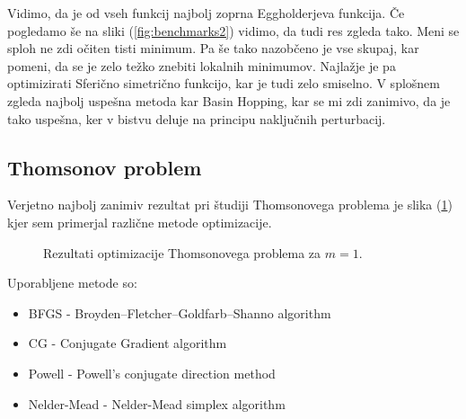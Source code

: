 \documentclass[a4paper]{article}
\begin{document}
Vidimo, da je od vseh funkcij najbolj zoprna Eggholderjeva funkcija. Če pogledamo še na sliki (\ref{fig:benchmarks2})
vidimo, da tudi res zgleda tako. Meni se sploh ne zdi očiten tisti minimum. Pa še tako nazobčeno je vse skupaj, kar 
pomeni, da se je zelo težko znebiti lokalnih minimumov. Najlažje je pa optimizirati Sferično simetrično funkcijo,
kar je tudi zelo smiselno. V splošnem zgleda najbolj uspešna metoda kar Basin Hopping, kar se mi zdi zanimivo, da
je tako uspešna, ker v bistvu deluje na principu naključnih perturbacij. \\

\subsection{Thomsonov problem}
Verjetno najbolj zanimiv rezultat pri študiji Thomsonovega problema je slika (\ref{fig:thomson_benchmark}) kjer sem 
primerjal različne metode optimizacije. 

\begin{figure}[H]
    \centering
    \caption{Rezultati optimizacije Thomsonovega problema za $m=1$.}
    \label{fig:thomson_benchmark}
\end{figure}

Uporabljene metode so:

\begin{itemize}
    \item BFGS - Broyden–Fletcher–Goldfarb–Shanno algorithm
    \item CG - Conjugate Gradient algorithm
    \item Powell - Powell’s conjugate direction method
    \item Nelder-Mead - Nelder-Mead simplex algorithm
\end{itemize}
\end{document}
